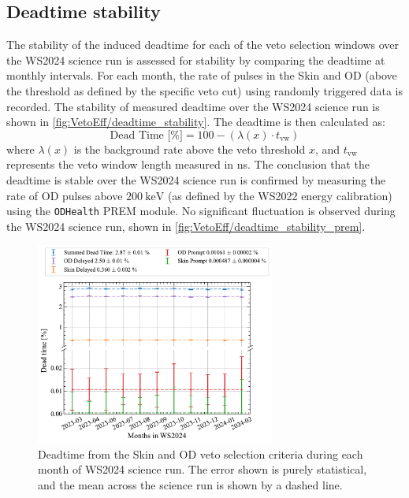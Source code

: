 \subsection{Deadtime stability}\label{sec:VetoEff/DeadtimeStability}
The stability of the induced deadtime for each of the veto selection windows over the WS2024 science run is assessed for stability by comparing the deadtime at monthly intervals. For each month, the rate of pulses in the Skin and OD (above the threshold as defined by the specific veto cut) using randomly triggered data is recorded. The stability of measured deadtime over the WS2024 science run is shown in \autoref{fig:VetoEff/deadtime_stability}.
The deadtime is then calculated as:
\begin{equation}
	\textrm{Dead Time [\%]} = 100 - (\lambda(x)\cdot t_{\text{vw}})
\end{equation}
where $\lambda(x)$ is the background rate above the veto threshold $x$, and $t_{\text{vw}}$ represents the veto window length measured in ns.
The conclusion that the deadtime is stable over the WS2024 science run is confirmed by measuring the rate of OD pulses above $200~\text{keV}$ (as defined by the WS2022 energy calibration) using the \lstinline{ODHealth} PREM module. No significant fluctuation is observed during the WS2024 science run, shown in \autoref{fig:VetoEff/deadtime_stability_prem}.
\begin{figure}[!h]
	\centering
	\includegraphics[width=0.7\textwidth]{figures/VetoEfficiency/SR3DeadTimeAll_withMean.pdf}
	\caption[Deadtime from the Skin and OD veto selection criteria during each month of WS2024 science run.]{Deadtime from the Skin and OD veto selection criteria during each month of WS2024 science run. The error shown is purely statistical, and the mean across the science run is shown by a dashed line.}
	\label{fig:VetoEff/deadtime_stability}
\end{figure}
